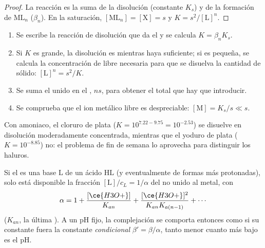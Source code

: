 \begin{proof}
La reacción es la suma de la disolución (constante $K_s$) y de la
formación de $\mathrm{ML}_n$ ($\beta_n$). En la saturación, $[\mathrm{ML}_n]
= [\mathrm{X}] = s$ y $K = s^2/[\mathrm{L}]^n$.
\end{proof}

\begin{method}\label{met:b1:complexation:dissolve-precipitate}
\begin{enumerate}
  \item Se escribe la reacción de disolución que da el  y se
        calcula
        $K = \beta_n K_s$.
  \item Si $K$ es grande, la disolución es  mientras haya
         suficiente; si es pequeña, se calcula la concentración de
         libre necesaria para que se disuelva la cantidad de
        sólido:
        $[\mathrm{L}]^n = s^2/K$.
  \item Se suma el  unido en el , $n s$, para obtener el
         total que hay que introducir.
  \item Se comprueba que el ion metálico libre es despreciable:
        $[\mathrm{M}] = K_s/s
        \ll s$.
\end{enumerate}
\end{method}

Con amoniaco, el cloruro de plata ($K = 10^{7.22 - 9.75} = 10^{-2.53}$)
se disuelve en disolución moderadamente concentrada, mientras que el
yoduro de plata ($K = 10^{-8.85}$) no: el problema de fin de semana lo
aprovecha para distinguir los haluros.

\begin{proposition}\label{prop:b1:complexation:ligand-acidity}
Si el  es una base $\mathrm{L}$ de un ácido $\mathrm{HL}$ (y
eventualmente de formas más protonadas), solo está disponible la fracción
$[\mathrm{L}]/c_L =
1/\alpha$ del  no unido al metal, con
\[
  \alpha = 1 + \frac{[\ce{H3O+}]}{K_{an}} + \frac{[\ce{H3O+}]^2}{K_{an}K_{a(n-1)}}
  + \cdots
\]
($K_{an}$, la última ). A un pH fijo, la complejación
se comporta entonces como si su constante fuera la constante
\emph{condicional} $\beta' = \beta/\alpha$, tanto menor cuanto más bajo
es el pH.
\end{proposition}

